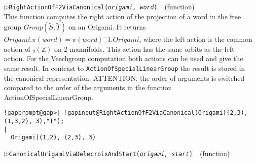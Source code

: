 \documentclass[a4paper,11pt]{report}
\begin{document}
{{{\begin{Verbatim}[commandchars=!@|,fontsize=\small,frame=single,label=Example]
\end{Verbatim}
 \noindent\textcolor{FuncColor}{$\triangleright$\enspace\texttt{RightActionOfF2ViaCanonical({\mdseries\slshape origami, word})
\label{RightActionOfF2ViaCanonical}
}\hfill{\scriptsize (function)}}\\


 This function computes the right action of the projection of a word in the
free group $Group(\tilde{S}, \tilde{T})$ on an Origami. It returns $Origami.\pi(word) = \pi(word)^-1.Origami$, where the left action is the common action of $_2(\mathbb{Z})$ on 2-mannifolds. This action has the same orbits as the left action. For the
Veechgroup computation both actions can be used and give the same result. In
contrast to \texttt{ActionOfSpecialLinearGroup} the result is stored in the canonical representation. ATTENTION: the order of
arguments is switched compared to the order of the arguments in the function
ActionOfSpecialLinearGroup. 
\begin{Verbatim}[commandchars=!@|,fontsize=\small,frame=single,label=Example]
  !gapprompt@gap>| !gapinput@RightActionOfF2ViaCanonical(Origami((2,3), (1,3,2), 3),"T");
|
  Origami((1,2), (2,3), 3)
\end{Verbatim}
 \noindent\textcolor{FuncColor}{$\triangleright$\enspace\texttt{CanonicalOrigamiViaDelecroixAndStart({\mdseries\slshape origami, start})
\label{CanonicalOrigamiViaDelecroixAndStart}
}\hfill{\scriptsize (function)}}\\


}}}
\end{document}
